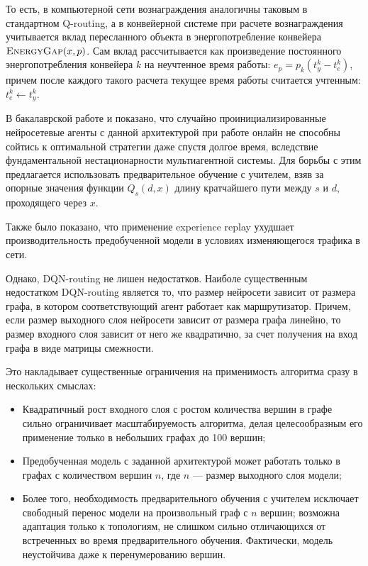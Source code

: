 \documentclass[specification,annotation,times]{itmo-student-thesis}
\theoremstyle{definition}
\begin{document}
То есть, в компьютерной сети вознаграждения аналогичны таковым в стандартном
Q-routing, а в конвейерной системе при расчете вознаграждения учитывается вклад
пересланного объекта в энергопотребление конвейера $\textsc{EnergyGap}(x, p)$.
Сам вклад рассчитывается как произведение постоянного энергопотребления
конвейера $k$ на неучтенное время работы: $e_p = p_k (t_y^k - t_e^k)$, причем
после каждого такого расчета текущее время работы считается учтенным:
$t_e^k \gets t_y^k$.

В бакалаврской работе и \cite{mukhutdinov2019multi} показано, что случайно
проинициализированные нейросетевые агенты с данной архитектурой при работе
онлайн не способны сойтись к оптимальной стратегии даже спустя долгое время,
вследствие фундаментальной нестационарности мультиагентной системы. Для борьбы с
этим предлагается использовать предварительное обучение с учителем, взяв за
опорные значения функции $Q_s(d, x)$ длину кратчайшего пути между $s$ и $d$,
проходящего через $x$.

Также было показано, что применение experience replay ухудшает
производительность предобученной модели в условиях изменяющегося трафика в сети.

Однако, DQN-routing не лишен недостатков. Наиболе существенным недостатком
DQN-routing является то, что размер нейросети
зависит от размера графа, в котором соответствующий агент работает как
маршрутизатор. Причем, если размер выходного слоя нейросети зависит от размера
графа линейно, то размер входного слоя зависит от него же квадратично, за счет
получения на вход графа в виде матрицы смежности.

Это накладывает существенные ограничения на применимость алгоритма сразу в
нескольких смыслах:

\begin{itemize}
\item Квадратичный рост входного слоя с ростом количества вершин в графе сильно
  ограничивает масштабируемость алгоритма, делая целесообразным его применение
  только в небольших графах до 100 вершин;
\item Предобученная модель с заданной архитектурой может работать только в
  графах с количеством вершин $n$, где $n$ --- размер выходного слоя модели;
\item Более того, необходимость предварительного обучения с учителем исключает
  свободный перенос модели на произвольный граф с $n$ вершин; возможна адаптация
  только к топологиям, не слишком сильно отличающихся от встреченных во время
  предварительного обучения. Фактически, модель неустойчива даже к
  перенумерованию вершин.
\end{itemize}
\end{document}

